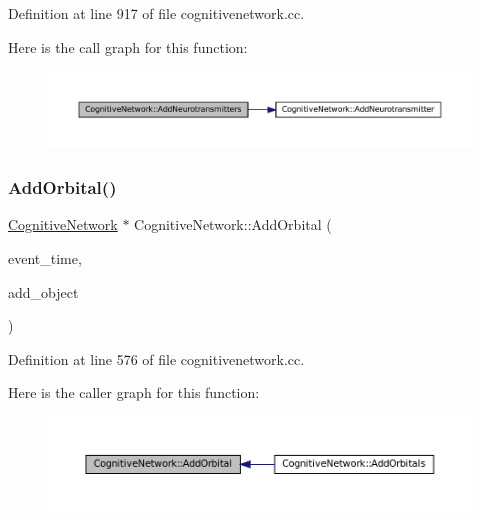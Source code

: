 Definition at line 917 of file cognitivenetwork.\+cc.

Here is the call graph for this function\+:\nopagebreak
\begin{figure}[H]
\begin{center}
\leavevmode
\includegraphics[width=350pt]{class_cognitive_network_a085f61ab94b71406a0a5e11d789ed69c_cgraph}
\end{center}
\end{figure}
\mbox{\label{class_cognitive_network_ab6caa285c25568259ae935cf9e746af4}} 
\subsubsection{\texorpdfstring{Add\+Orbital()}{AddOrbital()}}
{\footnotesize\ttfamily \mbox{\hyperlink{class_cognitive_network}{Cognitive\+Network}} $\ast$ Cognitive\+Network\+::\+Add\+Orbital (\begin{DoxyParamCaption}\item[{std\+::chrono\+::time\+\_\+point$<$ \mbox{\hyperlink{universe_8h_a0ef8d951d1ca5ab3cfaf7ab4c7a6fd80}{Clock}} $>$}]{event\+\_\+time,  }\item[{\mbox{\hyperlink{class_cognitive_network}{Cognitive\+Network}} $\ast$}]{add\+\_\+object }\end{DoxyParamCaption})}



Definition at line 576 of file cognitivenetwork.\+cc.

Here is the caller graph for this function\+:\nopagebreak
\begin{figure}[H]
\begin{center}
\leavevmode
\includegraphics[width=350pt]{class_cognitive_network_ab6caa285c25568259ae935cf9e746af4_icgraph}
\end{center}
\end{figure}
\mbox{\label{class_cognitive_network_a9dbf4a9fab3b806d2bd6b2701b7a9548}} 
